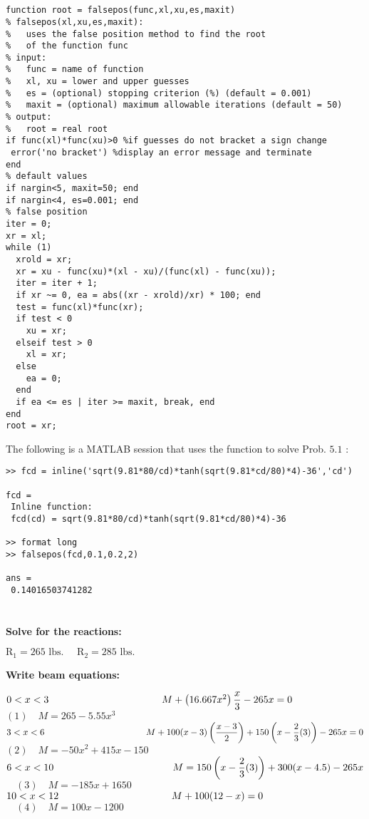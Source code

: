 \documentclass[../main.tex]{subfiles}
\begin{document}
\section{}
\begin{lstlisting}[numbers=none]
function root = falsepos(func,xl,xu,es,maxit)
% falsepos(xl,xu,es,maxit):
%   uses the false position method to find the root
%   of the function func
% input:
%   func = name of function
%   xl, xu = lower and upper guesses
%   es = (optional) stopping criterion (%) (default = 0.001)
%   maxit = (optional) maximum allowable iterations (default = 50)
% output:
%   root = real root
if func(xl)*func(xu)>0 %if guesses do not bracket a sign change
 error('no bracket') %display an error message and terminate
end
% default values
if nargin<5, maxit=50; end
if nargin<4, es=0.001; end
% false position
iter = 0;
xr = xl;
while (1)
  xrold = xr;
  xr = xu - func(xu)*(xl - xu)/(func(xl) - func(xu));
  iter = iter + 1;
  if xr ~= 0, ea = abs((xr - xrold)/xr) * 100; end
  test = func(xl)*func(xr);
  if test < 0
    xu = xr;
  elseif test > 0
    xl = xr;
  else
    ea = 0;
  end
  if ea <= es | iter >= maxit, break, end
end
root = xr;
\end{lstlisting}
 \bigbreak
 The following is a MATLAB session that uses the function to solve Prob. $5.1$ :
 \bigbreak
\begin{lstlisting}[numbers=none]
 >> fcd = inline('sqrt(9.81*80/cd)*tanh(sqrt(9.81*cd/80)*4)-36','cd')
 
fcd =
 Inline function:
 fcd(cd) = sqrt(9.81*80/cd)*tanh(sqrt(9.81*cd/80)*4)-36
 
>> format long
>> falsepos(fcd,0.1,0.2,2)

ans =
 0.14016503741282
\end{lstlisting}
 
 
\section{}
\textbf{Solve for the reactions:}

\bigbreak
$\mathrm{R}_{1}=265 \text { lbs. } \quad \mathrm{R}_{2}=285 \text { lbs. }$
\bigbreak

\textbf{Write beam equations:}
\bigbreak

$0<x<3 \hspace*{4cm} M+\left(16.667 x^{2}\right) \dfrac{x}{3}-265 x=0$
\bigbreak
\hspace*{5.2cm} $(1) \quad M=265-5.55 x^{3}$
\bigbreak
\bigbreak
$3<x<6 \hspace*{4cm} M+100(x-3)\left(\dfrac{x-3}{2}\right)+150\left(x-\dfrac{2}{3}(3)\right)-265 x=0$
\bigbreak
\hspace*{5.2cm} $(2)\quad M=-50 x^{2}+415 x-150$
\bigbreak
\bigbreak
$6<x<10 \hspace*{4.1cm}\ M=150\left(x-\dfrac{2}{3}(3)\right)+300(x-4.5)-265 x$
\bigbreak
\hspace*{5.2cm} $\quad(3)\quad M=-185 x+1650$
\bigbreak
\bigbreak
$10<x<12 \hspace*{4cm} M+100(12-x)=0$
\bigbreak
\hspace*{5.2cm} $\quad(4)\quad M=100 x-1200$
\bigbreak
\end{document}
